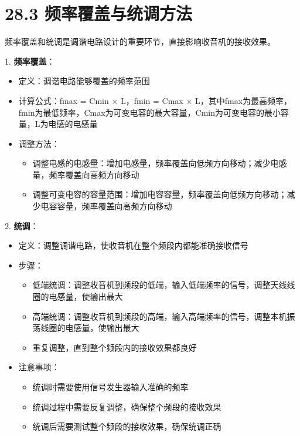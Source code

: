\documentclass[12pt,UTF8]{ctexbook}
\begin{document}
\section*{28.3 频率覆盖与统调方法}

频率覆盖和统调是调谐电路设计的重要环节，直接影响收音机的接收效果。

1. \textbf{频率覆盖}：
   \begin{itemize}[leftmargin=3.5em]
   \item 定义：调谐电路能够覆盖的频率范围
   \item 计算公式：fmax = Cmin × L，fmin = Cmax × L，其中fmax为最高频率，fmin为最低频率，Cmax为可变电容的最大容量，Cmin为可变电容的最小容量，L为电感的电感量
   \item 调整方法：
     \begin{itemize}
     \item 调整电感的电感量：增加电感量，频率覆盖向低频方向移动；减少电感量，频率覆盖向高频方向移动
     \item 调整可变电容的容量范围：增加电容容量，频率覆盖向低频方向移动；减少电容容量，频率覆盖向高频方向移动
     \end{itemize}
   \end{itemize}

2. \textbf{统调}：
   \begin{itemize}[leftmargin=3.5em]
   \item 定义：调整调谐电路，使收音机在整个频段内都能准确接收信号
   \item 步骤：
     \begin{itemize}
     \item 低端统调：调整收音机到频段的低端，输入低端频率的信号，调整天线线圈的电感量，使输出最大
     \item 高端统调：调整收音机到频段的高端，输入高端频率的信号，调整本机振荡线圈的电感量，使输出最大
     \item 重复调整，直到整个频段内的接收效果都良好
     \end{itemize}
   \item 注意事项：
     \begin{itemize}
     \item 统调时需要使用信号发生器输入准确的频率
     \item 统调过程中需要反复调整，确保整个频段的接收效果
     \item 统调后需要测试整个频段的接收效果，确保统调正确
     \end{itemize}
   \end{itemize}
\end{document}
